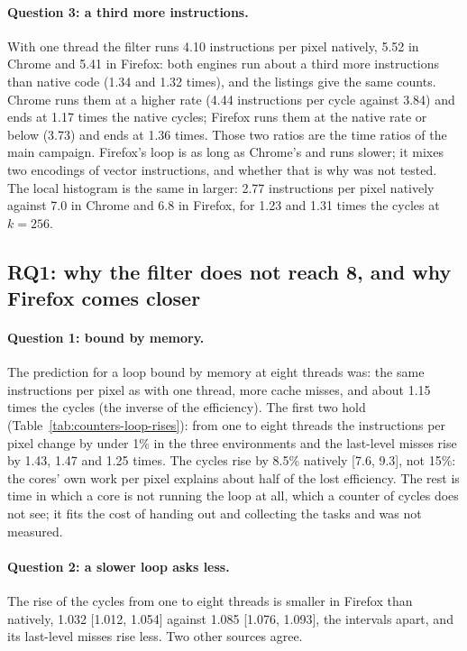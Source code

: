 \paragraph{Question 3: a third more instructions.} With one thread the
filter runs 4.10 instructions per pixel natively, 5.52 in Chrome and 5.41
in Firefox: both engines run about a third more instructions than native
code (1.34 and 1.32 times), and the listings give the same counts. Chrome
runs them at a higher rate (4.44 instructions per cycle against 3.84) and
ends at 1.17 times the native cycles; Firefox runs them at the native rate
or below (3.73) and ends at 1.36 times. Those two ratios are the time
ratios of the main campaign. Firefox's loop is as long as Chrome's and runs
slower; it mixes two encodings of vector instructions, and whether that is
why was not tested. The local histogram is the same in larger: 2.77
instructions per pixel natively against 7.0 in Chrome and 6.8 in Firefox,
for 1.23 and 1.31 times the cycles at $k=256$.

\subsection{RQ1: why the filter does not reach 8, and why Firefox comes closer}

\paragraph{Question 1: bound by memory.} The prediction for a loop bound by
memory at eight threads was: the same instructions per pixel as with one
thread, more cache misses, and about 1.15 times the cycles (the inverse of
the efficiency). The first two hold (Table~\ref{tab:counters-loop-rises}): from
one to eight threads the instructions per pixel change by under 1\% in the
three environments and the last-level misses rise by 1.43, 1.47 and 1.25
times. The cycles rise by 8.5\% natively [7.6, 9.3], not 15\%: the cores'
own work per pixel explains about half of the lost efficiency. The rest is
time in which a core is not running the loop at all, which a counter of
cycles does not see; it fits the cost of handing out and collecting the
tasks and was not measured.

\paragraph{Question 2: a slower loop asks less.} The rise of the cycles
from one to eight threads is smaller in Firefox than natively, 1.032
[1.012, 1.054] against 1.085 [1.076, 1.093], the intervals apart, and its
last-level misses rise less. Two other sources agree.


